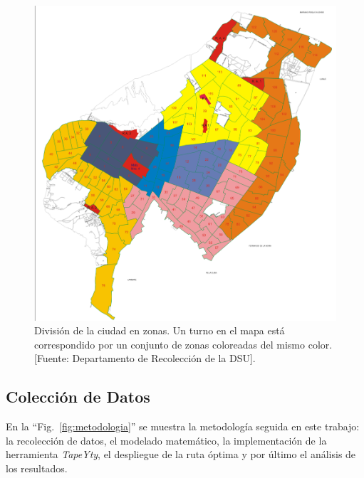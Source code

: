 \documentclass[spanish, conference]{IEEEtran}
\begin{document}
{%
\begin{figure}[htbp]
\centerline{\includegraphics{imagenes/Recoleccion-ZONAS&CUADRANTES.png}}
\caption{División de la ciudad en zonas. Un turno en el mapa está correspondido por un conjunto de zonas coloreadas del mismo color. [Fuente: Departamento de Recolección de la DSU].}
\label{fig:zonasRecoleccion}
\end{figure}

\subsection{Colección de Datos}


En la ``Fig.~\ref{fig:metodologia}'' se muestra la metodología seguida en este trabajo: la recolección de datos, el modelado matemático, la implementación de la herramienta \textit{TapeYty}, el despliegue de la ruta óptima y por último el análisis de los resultados.

}
\end{document}
